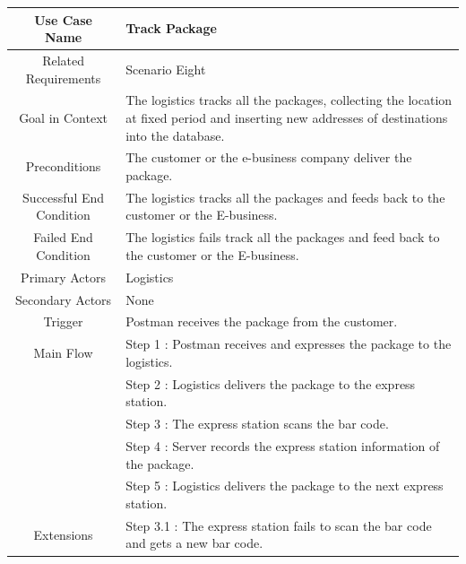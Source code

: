 \documentclass[12pt]{scrreprt}
\begin{document}
\begin{table}[H]
  \centering
  \begin{tabular}{| c | p{11cm} |}
    \hline
    Use Case Name & Track Package\\
    \hline
    Related Requirements & Scenario Eight\\
    \hline
    Goal in Context & The logistics tracks all the packages, collecting the
    location at fixed period and inserting new addresses of destinations into
    the database.\\
    \hline
    Preconditions & The customer or the e-business company deliver the package.\\
    \hline
    Successful End Condition & The logistics tracks all the packages and feeds
    back to the customer or the E-business.\\
    \hline
    Failed End Condition & The logistics fails track all the packages and feed
    back to the customer or the E-business.\\
    \hline
    Primary Actors & Logistics\\
    \hline
    Secondary Actors & None\\
    \hline
    Trigger & Postman receives the package from the customer.\\
    \hline
    Main Flow & Step 1 : Postman receives and expresses the package to the
    logistics.\\
    & Step 2 : Logistics delivers the package to the express station.\\
    & Step 3 : The express station  scans the bar code.\\
    & Step 4 : Server records the express station information of the package.\\
    & Step 5 : Logistics delivers the package to the next express station.\\
    \hline
    Extensions & Step 3.1 : The express station fails to scan the bar code
    and gets a new bar code.\\
    \hline
  \end{tabular}
\end{table}
\end{document}
